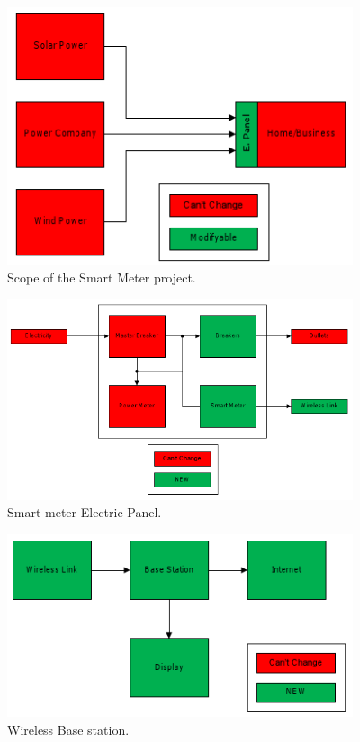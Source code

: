 \documentclass[titlepage,11pt,letterpaper]{article}
\begin{document}
\begin{spacing}{1.1}
\begin{figure}[htbp]
\begin{center}
\includegraphics[width=4in]{Block_Diagram_01}
\caption{Scope of the Smart Meter project.}
\label{fig:scope}
\end{center}
\end{figure}

\begin{figure}[htbp]
\begin{center}
\includegraphics[width=4in]{Block_Diagram_02}
\caption{Smart meter Electric Panel.}
\label{fig:coexist}
\end{center}
\end{figure}

\begin{figure}[htbp]
\begin{center}
\includegraphics[width=4in]{Block_Diagram_03}
\caption{Wireless Base station.}
\label{fig:base}
\end{center}
\end{figure}


\end{spacing}
\end{document}

